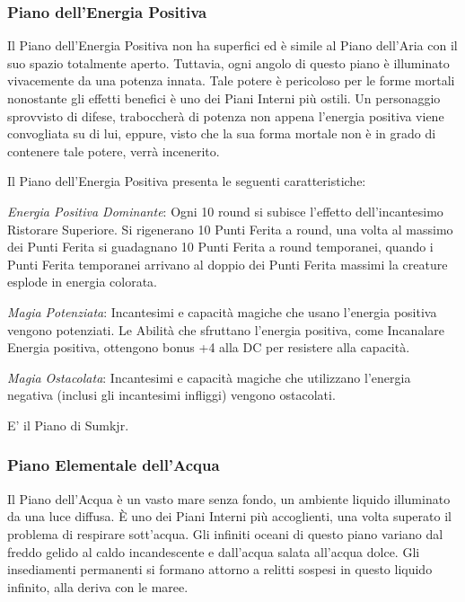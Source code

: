 \documentclass[a4paper,twoside,openany]{book}
\begin{document}
\begin{multicols}{2}
\subsubsection{Piano dell'Energia Positiva}\label{pianoenergiapositiva}
Il Piano dell'Energia Positiva non ha superfici ed è simile al Piano dell'Aria con il suo spazio totalmente aperto. Tuttavia, ogni angolo di questo piano è illuminato vivacemente da una potenza innata. Tale potere è pericoloso per le forme mortali nonostante gli effetti benefici è uno dei Piani Interni più ostili. Un personaggio sprovvisto di difese, traboccherà di potenza non appena l'energia positiva viene convogliata su di lui, eppure, visto che la sua forma mortale non è in grado di contenere tale potere, verrà incenerito.

Il Piano dell'Energia Positiva presenta le seguenti caratteristiche:

\emph{Energia Positiva Dominante}: Ogni 10 round si subisce l'effetto dell'incantesimo Ristorare Superiore. Si rigenerano 10 Punti Ferita a round, una volta al massimo dei Punti Ferita si guadagnano 10 Punti Ferita a round temporanei, quando i Punti Ferita temporanei arrivano al doppio dei Punti Ferita massimi la creature esplode in energia colorata.

\emph{Magia Potenziata}: Incantesimi e capacità magiche che usano l'energia positiva vengono potenziati. Le Abilità che sfruttano l'energia positiva, come Incanalare Energia positiva, ottengono bonus +4 alla DC per resistere alla capacità.

\emph{Magia Ostacolata}: Incantesimi e capacità magiche che utilizzano l'energia negativa (inclusi gli incantesimi infliggi) vengono ostacolati.

E' il Piano di Sumkjr.

\subsubsection{Piano Elementale dell'Acqua}\label{pianoacqua}
Il Piano dell'Acqua è un vasto mare senza fondo, un ambiente liquido illuminato da una luce diffusa. È uno dei Piani Interni più accoglienti, una volta superato il problema di respirare sott'acqua. Gli infiniti oceani di questo piano variano dal freddo gelido al caldo incandescente e dall'acqua salata all'acqua dolce. Gli insediamenti permanenti si formano attorno a relitti sospesi in questo liquido infinito, alla deriva con le maree.


\end{multicols}
\end{document}
